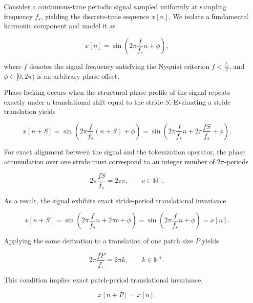 Consider a continuous-time periodic signal sampled uniformly at sampling frequency $f_s$, yielding the discrete-time sequence $x[n]$. We isolate a fundamental harmonic component and model it as

\begin{equation}
\label{eq:sinusoid}
x[n]
=
\sin\!\left(
2\pi\frac{f}{f_s}n+\phi
\right),
\end{equation}

where $f$ denotes the signal frequency satisfying the Nyquist criterion $f < \frac{f_s}{2}$, and $\phi\in[0,2\pi)$ is an arbitrary phase offset.

Phase-locking occurs when the structural phase profile of the signal repeats exactly under a translational shift equal to the stride $S$. Evaluating a stride translation yields

\begin{equation}
\label{eq:stride_translation}
x[n+S]
=
\sin\!\left(
2\pi\frac{f}{f_s}(n+S)+\phi
\right)
=
\sin\!\left(
2\pi\frac{f}{f_s}n
+
2\pi\frac{fS}{f_s}
+
\phi
\right).
\end{equation}

For exact alignment between the signal and the tokenization operator, the phase accumulation over one stride must correspond to an integer number of $2\pi$-periods

\begin{equation}
\label{eq:phase_boundary}
2\pi\frac{fS}{f_s}
=
2\pi c,
\qquad
c\in\mathbb{N}^{+}.
\end{equation}

As a result, the signal exhibits exact stride-period translational invariance

\begin{equation}
\label{eq:stride_translation_invariance}
x[n+S]
=
\sin\!\left(
2\pi\frac{f}{f_s}n
+
2\pi c
+
\phi
\right)
=
\sin\!\left(
2\pi\frac{f}{f_s}n
+\phi
\right)
=
x[n].
\end{equation}

Applying the same derivation to a translation of one patch size $P$ yields

\begin{equation}
\label{eq:phase_boundary_2}
2\pi\frac{fP}{f_s}
=
2\pi k,
\qquad
k\in\mathbb{N}^{+}.
\end{equation}

This condition implies exact patch-period translational invariance,

\begin{equation}
\label{eq:patch_translation_invariance}
x[n+P]
=
x[n].
\end{equation}

